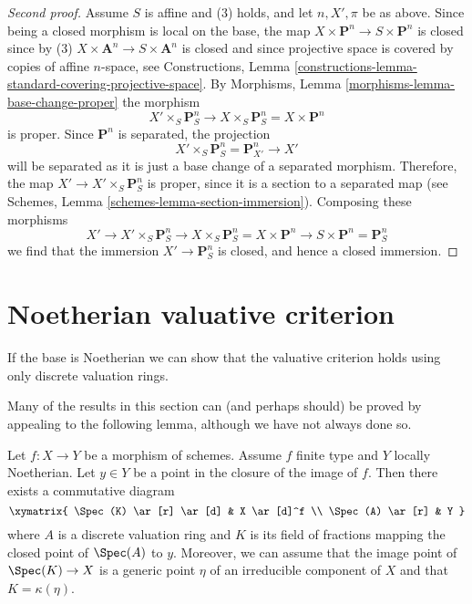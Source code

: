 \begin{proof}[Second proof]
\medskip\noindent
Assume $S$ is affine and (3) holds, and let $n, X', \pi$ be as above.
Since being a closed morphism is local on the base, the map
$X \times \mathbf{P}^n \to S \times \mathbf{P}^n$ is closed since by (3)
$X \times \mathbf{A}^n \to S \times \mathbf{A}^n$ is closed and since
projective space is covered by copies of affine $n$-space, see
Constructions,
Lemma \ref{constructions-lemma-standard-covering-projective-space}.
By Morphisms, Lemma \ref{morphisms-lemma-base-change-proper}
the morphism
$$
X' \times_S \mathbf{P}^n_S
\to
X \times_S \mathbf{P}^n_S =
X \times \mathbf{P}^n
$$
is proper. Since $\mathbf{P}^n$ is separated, the projection
$$
X' \times_S \mathbf{P}^n_S = \mathbf{P}^n_{X'} \to X'
$$
will be separated as it is just a base change of a separated
morphism. Therefore, the map $X' \to X' \times_S \mathbf{P}^n_S$ is proper,
since it is a section to a separated map (see
Schemes, Lemma \ref{schemes-lemma-section-immersion}).
Composing these morphisms
$$
X' \to X' \times_S \mathbf{P}^n_S \to X \times_S \mathbf{P}^n_S
= X \times \mathbf{P}^n \to S \times \mathbf{P}^n = \mathbf{P}^n_S
$$
we find that the immersion $X' \to \mathbf{P}^n_S$ is closed, and
hence a closed immersion.
\end{proof}





\section{Noetherian valuative criterion}
\label{section-Noetherian-valuative-criterion}

\noindent
If the base is Noetherian we can show that the valuative criterion holds
using only discrete valuation rings.

\medskip\noindent
Many of the results in this section can (and perhaps should)
be proved by appealing to the following lemma, although we have not
always done so.

\begin{lemma}
\label{lemma-reach-point-closure-Noetherian}
Let $f : X \to Y$ be a morphism of schemes.
Assume $f$ finite type and $Y$ locally Noetherian.
Let $y \in Y$ be a point in the closure of the image of $f$.
Then there exists a commutative diagram
$$
\xymatrix{
\Spec(K) \ar[r] \ar[d] & X \ar[d]^f \\
\Spec(A) \ar[r] & Y
}
$$
where $A$ is a discrete valuation ring and $K$ is its field of fractions
mapping the closed point of $\Spec(A)$ to $y$. Moreover, we can assume
that the image point of $\Spec(K) \to X$ is a generic point $\eta$
of an irreducible component of $X$ and that $K = \kappa(\eta)$.
\end{lemma}

